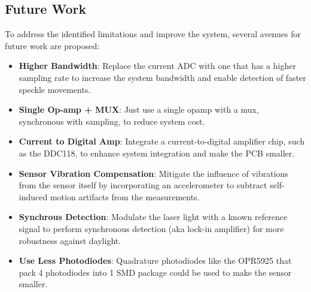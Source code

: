 \subsection{Future Work}
\label{sub:future_work}

To address the identified limitations and improve the system, several avenues for future work are proposed:

\begin{itemize}
    \item \textbf{Higher Bandwidth}: Replace the current ADC with one that has a higher sampling rate to increase the system bandwidth and enable detection of faster speckle movements.
    \item \textbf{Single Op-amp + MUX}: Just use a single opamp with a mux, synchronous with sampling, to reduce system cost.
    \item \textbf{Current to Digital Amp}: Integrate a current-to-digital amplifier chip, such as the DDC118, to enhance system integration and make the PCB smaller.
    \item \textbf{Sensor Vibration Compensation}: Mitigate the influence of vibrations from the sensor itself by incorporating an accelerometer to subtract self-induced motion artifacts from the measurements.
    \item \textbf{Synchrous Detection}: Modulate the laser light with a known reference signal to perform synchronous detection (aka lock-in amplifier) for more robustness against daylight.
    \item \textbf{Use Less Photodiodes}: Quadrature photodiodes like the OPR5925 that pack 4 photodiodes into 1 SMD package could be used to make the sensor smaller.
\end{itemize}